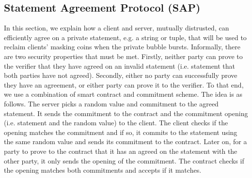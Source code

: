 
\subsection{Statement Agreement Protocol (SAP)}\label{SAP}



In this section, we explain how a client and server, mutually distrusted, can efficiently agree on a private statement, e.g.  a string or tuple, that will be used to reclaim clients' masking coins when the private bubble bursts. Informally, there are two security properties that must be met. Firstly, neither party can prove to the verifier that they have agreed on an invalid statement (i.e. statement that both parties have not agreed). Secondly,  either no party can successfully prove they have an agreement, or either party can prove it to the verifier.
 To that end, we use a combination of smart contract and commitment scheme. The idea is as follows. The server picks a random value and commitment to the agreed statement. It sends the commitment to the contract and the commitment opening (i.e. statement and the random value) to the client. The client checks if the opening matches the commitment and if so, it commits to the statement using the same random value and sends its commitment to the contract. Later on, for a party to prove to the contract  that it has an agreed on the statement with the other party, it only sends the opening of the commitment.  The contract checks if the opening matches both commitments and accepts if it matches. 




